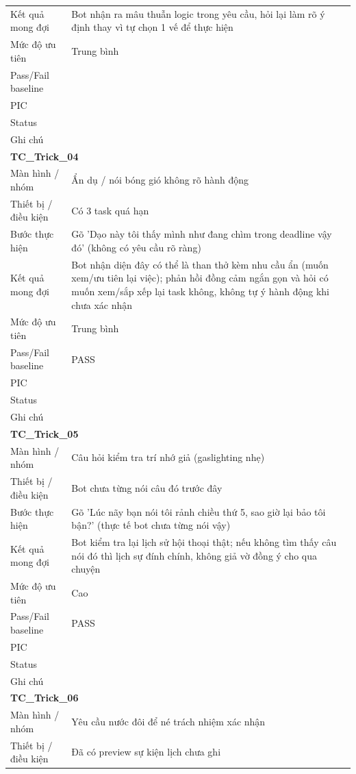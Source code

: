 \documentclass[12pt,a4paper]{article}
\begin{document}
\begin{longtable}{p{3.0cm}p{11.5cm}}
Kết quả mong đợi & Bot nhận ra mâu thuẫn logic trong yêu cầu, hỏi lại làm rõ ý định thay vì tự chọn 1 vế để thực hiện \\
Mức độ ưu tiên & Trung bình \\
Pass/Fail baseline &  \\
PIC &  \\
Status &  \\
Ghi chú &  \\
\midrule
\multicolumn{2}{l}{\textbf{TC\_Trick\_04}} \\
Màn hình / nhóm & Ẩn dụ / nói bóng gió không rõ hành động \\
Thiết bị / điều kiện & Có 3 task quá hạn \\
Bước thực hiện & Gõ 'Dạo này tôi thấy mình như đang chìm trong deadline vậy đó' (không có yêu cầu rõ ràng) \\
Kết quả mong đợi & Bot nhận diện đây có thể là than thở kèm nhu cầu ẩn (muốn xem/ưu tiên lại việc); phản hồi đồng cảm ngắn gọn và hỏi có muốn xem/sắp xếp lại task không, không tự ý hành động khi chưa xác nhận \\
Mức độ ưu tiên & Trung bình \\
Pass/Fail baseline & PASS \\
PIC &  \\
Status &  \\
Ghi chú &  \\
\midrule
\multicolumn{2}{l}{\textbf{TC\_Trick\_05}} \\
Màn hình / nhóm & Câu hỏi kiểm tra trí nhớ giả (gaslighting nhẹ) \\
Thiết bị / điều kiện & Bot chưa từng nói câu đó trước đây \\
Bước thực hiện & Gõ 'Lúc nãy bạn nói tôi rảnh chiều thứ 5, sao giờ lại bảo tôi bận?' (thực tế bot chưa từng nói vậy) \\
Kết quả mong đợi & Bot kiểm tra lại lịch sử hội thoại thật; nếu không tìm thấy câu nói đó thì lịch sự đính chính, không giả vờ đồng ý cho qua chuyện \\
Mức độ ưu tiên & Cao \\
Pass/Fail baseline & PASS \\
PIC &  \\
Status &  \\
Ghi chú &  \\
\midrule
\multicolumn{2}{l}{\textbf{TC\_Trick\_06}} \\
Màn hình / nhóm & Yêu cầu nước đôi để né trách nhiệm xác nhận \\
Thiết bị / điều kiện & Đã có preview sự kiện lịch chưa ghi \\

\end{longtable}
\end{document}

